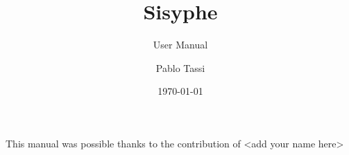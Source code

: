 \documentclass[Sisyphe]{../../data/TelemacDoc} %
\begin{document}
\let\cleardoublepage\clearpage

\setlength\parindent{0pt}

\title{Sisyphe}
\subtitle{User Manual}
\author{Pablo Tassi}
\date{\today}
\maketitle
\clearpage



\newpage

\thispagestyle{empty}

\TelemacCopyright{}




\pagestyle{empty} %

\tableofcontents%


\pagestyle{fancy} %

\pagebreak
This manual was possible thanks to the contribution of <add your name here>
\pagebreak





\end{document}
